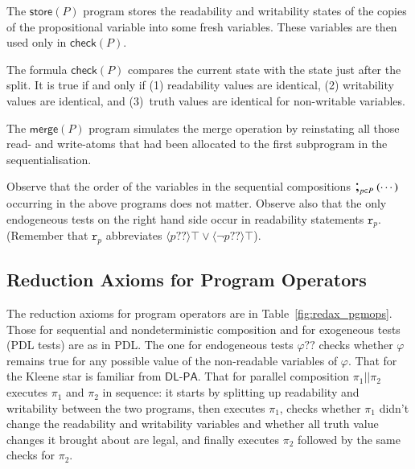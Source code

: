 \documentclass{llncs}
\newcommand{\progStore}{\mathsf{store}}
\newcommand{\progOkChange}{\mathsf{check}}
\newcommand{\progsplit}{\mathsf{split}}
\newcommand{\progmerge}{\mathsf{merge}}
\newcommand{\modl}{\mathsf m}
\newcommand{\pll}{ {||} }							%
\newcommand{\readable}[1]{\mathtt{r}_{#1}}
\newcommand{\testendo}{?\!\!?}			%
\newcommand{\Dlpa}{\ensuremath{\mathsf{DL\text{-}PA}}\xspace}
\newcommand{\intPgm}[1]{\llbracket #1 \rrbracket}
\newcommand{\ldia}[1]{ \big\langle #1 \big\rangle}
\renewcommand{\phi}{\varphi}
\newcommand{\seqseq}[1]{ \text{\Large ;}_{#1} ~ }
\begin{document}
The $\progStore(P)$ program stores the readability and writability states of the
copies of the propositional variable into some fresh variables.
These variables are then used only in $\progOkChange(P)$.

The formula $\progOkChange(P)$ compares the current state with the state just after the split.
It is true if and only if
(1) readability values are identical, 
(2) writability values are identical, and
(3)~truth values are identical for non-writable variables.

The $\progmerge(P)$ program simulates the merge operation by reinstating all those 
read- and write-atoms that had been allocated to the first subprogram in the sequentialisation. 

Observe that the order of the variables in the sequential compositions $ \seqseq{p \in P} ( \cdots ) $ occurring in the above programs does not matter. 
Observe also that the only endogeneous tests on the right hand side occur in readability statements $\readable p$. 
(Remember that $\readable p$ abbreviates $\ldia{ p \testendo} \top \lor \ldia{ \lnot p \testendo} \top $). 

%

\subsection{Reduction Axioms for Program Operators}\label{sec:redax_pgmop} 

The reduction axioms for program operators are in Table~\ref{fig:redax_pgmops}.
Those for sequential and nondeterministic composition and for exogeneous tests (PDL tests) are as in PDL. 
The one for endogeneous tests $ \phi \testendo$ 
checks whether $\phi$ remains true for any possible value of the non-readable variables of $\phi$. 
That for the Kleene star is familiar from \Dlpa. 
That for parallel composition $\pi_1 \pll \pi_2$ executes $\pi_1$ and $\pi_2$ in sequence:
it starts by splitting up readability and writability between the two programs,
then executes $\pi_1$, checks whether $\pi_1$ didn't change the readability and writability variables
and whether all truth value changes it brought about are legal, 
and finally executes $\pi_2$ followed by the same checks for $\pi_2$.
\end{document}
